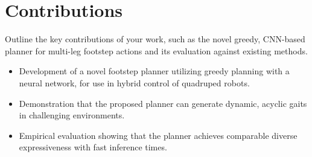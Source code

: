 \section{Contributions}

\begin{outline}
  Outline the key contributions of your work, such as the novel
  greedy, CNN-based planner for multi-leg footstep actions and its
  evaluation against existing methods.
\end{outline}

\begin{itemize}
  \item Development of a novel footstep planner utilizing greedy planning
    with a neural network, for use in hybrid control of quadruped robots.
  \item Demonstration that the proposed planner can generate dynamic,
    acyclic gaits in challenging environments.
  \item Empirical evaluation showing that the planner achieves
    comparable diverse expressiveness with fast inference times.
\end{itemize}
